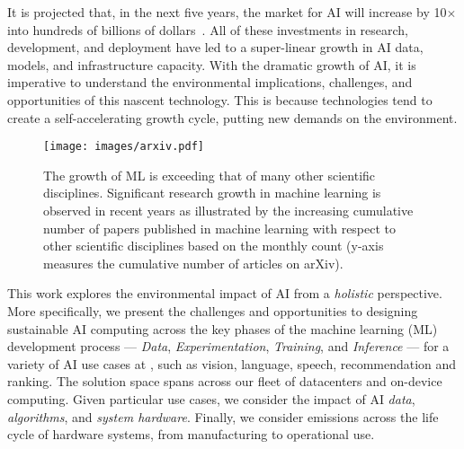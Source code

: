 It is projected that, in the next five years, the market for AI will increase by 10$\times$ into hundreds of billions of dollars~\cite{AI-market}. 
All of these investments in research, development, and deployment have led to a super-linear growth in AI data, models, and infrastructure capacity.
With the dramatic growth of AI, it is imperative to understand the environmental implications, challenges, and opportunities of this nascent technology. This is because technologies tend to create a self-accelerating growth cycle, putting new demands on the environment. 

\begin{figure}[t]
    \centering
    \texttt{[image: images/arxiv.pdf]}
    \caption{The growth of ML is exceeding that of many other scientific disciplines. Significant research growth in machine learning is observed in recent years as illustrated by the increasing cumulative number of papers published in machine learning with respect to other scientific disciplines based on the monthly count
    (y-axis measures the cumulative number of articles on arXiv).
    }
    \vspace{-0.5cm}
    \label{fig:ai-growth}
\end{figure}

This work explores the environmental impact of AI from a \textit{holistic} perspective. 
More specifically, we present the challenges and opportunities to designing sustainable AI computing across the key phases of the machine learning (ML) development process --- \textit{Data}, \textit{Experimentation}, \textit{Training}, and \textit{Inference} --- for a variety of AI use cases at \fb, such as vision, language, speech, recommendation and ranking. The solution space spans across our fleet of datacenters and on-device computing. 
Given particular use cases, we consider the impact of AI \textit{data}, \textit{algorithms}, and \textit{system hardware}.
Finally, we consider emissions across the life cycle of hardware systems, from manufacturing to operational use. 

